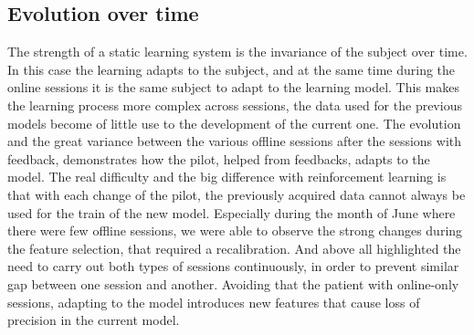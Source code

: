 \subsection{Evolution over time}\label{subsec:status}
The strength of a static learning system is the invariance of the subject over time. In this case the learning adapts to the subject, and at the same time during the online sessions it is the same subject to adapt to the learning model.
This makes the learning process more complex across sessions, the data used for the previous models become of little use to the development of the current one. The evolution and the great variance between the various offline sessions after the sessions with feedback, demonstrates how the pilot, helped from feedbacks, adapts to the model. The real difficulty and the big difference with reinforcement learning is that with each change of the pilot, the previously acquired data cannot always be used for the train of the new model. Especially during the month of June where there were few offline sessions, we were able to observe the strong changes during the feature selection, that required a recalibration. And above all highlighted the need to carry out both types of sessions continuously, in order to prevent similar gap between one session and another. Avoiding that the patient with online-only sessions, adapting to the model introduces new features that cause loss of precision in the current model.



